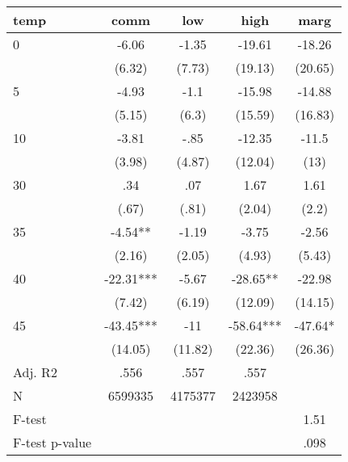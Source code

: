 \documentclass[]{article}
\begin{document}
\begin{tabular}{lcccc} \hline
temp & comm & low & high & marg \\ \hline
0 & -6.06 & -1.35 & -19.61 & -18.26 \\
 & (6.32) & (7.73) & (19.13) & (20.65) \\
5 & -4.93 & -1.1 & -15.98 & -14.88 \\
 & (5.15) & (6.3) & (15.59) & (16.83) \\
10 & -3.81 & -.85 & -12.35 & -11.5 \\
 & (3.98) & (4.87) & (12.04) & (13) \\
30 & .34 & .07 & 1.67 & 1.61 \\
 & (.67) & (.81) & (2.04) & (2.2) \\
35 & -4.54** & -1.19 & -3.75 & -2.56 \\
 & (2.16) & (2.05) & (4.93) & (5.43) \\
40 & -22.31*** & -5.67 & -28.65** & -22.98 \\
 & (7.42) & (6.19) & (12.09) & (14.15) \\
45 & -43.45*** & -11 & -58.64*** & -47.64* \\
 & (14.05) & (11.82) & (22.36) & (26.36) \\
\hline Adj. R2 & .556 & .557 & .557 &  \\
N & 6599335 & 4175377 & 2423958 &  \\
F-test &  &  &  & 1.51 \\
 F-test p-value &  &  &  & .098 \\ \hline
\end{tabular}
\end{document}
